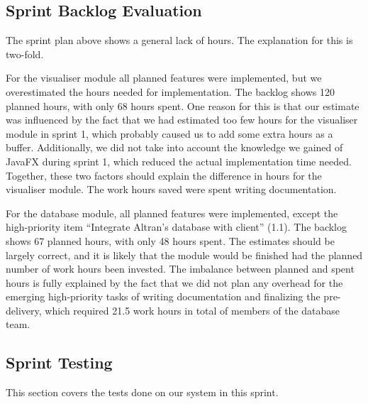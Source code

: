 \documentclass[../document]{subfiles}
\begin{document}
\newpage
\subsection{Sprint Backlog Evaluation}
The sprint plan above shows a general lack of hours. The explanation for this is two-fold.

For the visualiser module all planned features were implemented, but we overestimated the hours needed for implementation. The backlog shows 120 planned hours, with only 68 hours spent. One reason for this is that our estimate was influenced by the fact that we had estimated too few hours for the visualiser module in sprint 1, which probably caused us to add some extra hours as a buffer. Additionally, we did not take into account the knowledge we gained of \gls{JavaFX} during sprint 1, which reduced the actual implementation time needed. Together, these two factors should explain the difference in hours for the visualiser module. The work hours saved were spent writing documentation.

For the database module, all planned features were implemented, except the high-priority item “Integrate \gls{Altran}'s database with client” (1.1). The backlog shows 67 planned hours, with only 48 hours spent. The estimates should be largely correct, and it is likely that the module would be finished had the planned number of work hours been invested. The imbalance between planned and spent hours is fully explained by the fact that we did not plan any overhead for the emerging high-priority tasks of writing documentation and finalizing the pre-delivery, which required 21.5 work hours in total of members of the database team.

\newpage
\subsection{Sprint Testing}
This section covers the tests done on our system in this sprint.
\end{document}
